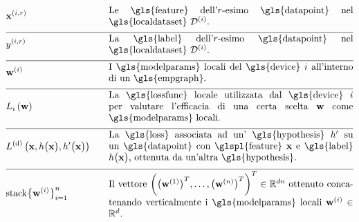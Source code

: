 \begin{align} 
		&\featurevec^{(\nodeidx,\sampleidx)} & \quad & \parbox{.75\textwidth}{Le \gls{feature} dell'$\sampleidx$-esimo \gls{datapoint} nel \gls{localdataset} $\localdataset{\nodeidx}$.} \nonumber \\[2mm] \hline \nonumber\\[-5mm]
	&\truelabel^{(\nodeidx,\sampleidx)} & \quad & \parbox{.75\textwidth}{La \gls{label} dell'$\sampleidx$-esimo \gls{datapoint} nel \gls{localdataset} $\localdataset{\nodeidx}$.} \nonumber \\[2mm] \hline \nonumber\\[-5mm]
		&\localparams{\nodeidx} & \quad & \parbox{.75\textwidth}{I \gls{modelparams} locali del \gls{device} $\nodeidx$ all'interno di un \gls{empgraph}.} \nonumber \\[2mm] \hline \nonumber\\[-5mm]
		&\locallossfunc{\nodeidx}{\weights} & \quad & \parbox{.75\textwidth}{La \gls{lossfunc} locale utilizzata dal \gls{device} $\nodeidx$ 
		per valutare l'efficacia di una certa scelta $\weights$ come \gls{modelparams} locali.}\nonumber \\[2mm] \hline \nonumber\\[-5mm]
	& \gtvloss{\featurevec}{\hypothesis\big(\featurevec\big)}{\hypothesis'\big(\featurevec\big)}& \quad & \parbox{.75\textwidth}{La \gls{loss} 
		associata ad un' \gls{hypothesis} $\hypothesis'$ su un \gls{datapoint} con \glspl{feature} $\featurevec$ e \gls{label} 
		$\hypothesis\big( \featurevec\big)$, ottenuta da un'altra \gls{hypothesis}.}\nonumber \\[2mm] \hline \nonumber\\[-5mm]
		& 	{\rm stack} \big\{ \weights^{(\nodeidx)} \big\}_{\nodeidx=1}^{\nrnodes} & \quad & \parbox{.75\textwidth}{Il vettore $\bigg( \big(\weights^{(1)}  \big)^{T}, \ldots, \big(\weights^{(\nrnodes)}  \big)^{T} \bigg)^{T} \in \mathbb{R}^{\dimlocalmodel\nrnodes}$ ottenuto concatenando verticalmente i \gls{modelparams} locali $\weights^{(\nodeidx)} \in \mathbb{R}^{\dimlocalmodel}$.} \nonumber  
\end{align}        


